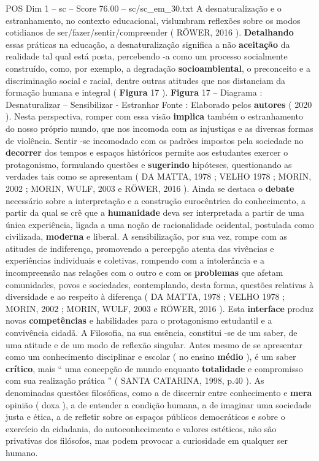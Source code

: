 \begin{textsample}{POS Dim 1 – sc – Score 76.00 – sc/sc\_em\_30.txt}
A desnaturalização e o estranhamento, no contexto educacional, vislumbram reflexões sobre os modos cotidianos de ser/fazer/sentir/compreender ( RÖWER, 2016 ). \textbf{Detalhando} essas práticas na educação, a desnaturalização significa a não \textbf{aceitação} da realidade tal qual está posta, percebendo -a como um processo socialmente construído, como, por exemplo, a degradação \textbf{socioambiental}, o preconceito e a discriminação social e racial, dentre outras atitudes que nos distanciam da formação humana e integral ( \textbf{Figura} 17 ). \textbf{Figura} 17 – Diagrama : Desnaturalizar – Sensibilizar - Estranhar Fonte : Elaborado pelos \textbf{autores} ( 2020 ).
Nesta perspectiva, romper com essa visão \textbf{implica} também o estranhamento do nosso próprio mundo, que nos incomoda com as injustiças e as diversas formas de violência.
Sentir -se incomodado com os padrões impostos pela sociedade no \textbf{decorrer} dos tempos e espaços históricos permite aos estudantes exercer o protagonismo, formulando questões e \textbf{sugerindo} hipóteses, questionando as verdades tais como se apresentam ( DA MATTA, 1978 ; VELHO 1978 ; MORIN, 2002 ; MORIN, WULF, 2003 e RÖWER, 2016 ).
Ainda se destaca o \textbf{debate} necessário sobre a interpretação e a construção eurocêntrica do conhecimento, a partir da qual se crê que a \textbf{humanidade} deva ser interpretada a partir de uma única experiência, ligada a uma noção de racionalidade ocidental, postulada como civilizada, \textbf{moderna} e liberal.
A sensibilização, por sua vez, rompe com as atitudes de indiferença, promovendo a percepção atenta das vivências e experiências individuais e coletivas, rompendo com a intolerância e a incompreensão nas relações com o outro e com os \textbf{problemas} que afetam comunidades, povos e sociedades, contemplando, desta forma, questões relativas à diversidade e ao respeito à diferença ( DA MATTA, 1978 ; VELHO 1978 ; MORIN, 2002 ; MORIN, WULF, 2003 e RÖWER, 2016 ).
Esta \textbf{interface} produz novas \textbf{competências} e habilidades para o protagonismo estudantil e a convivência cidadã.
A Filosofia, na sua essência, constitui -se de um saber, de uma atitude e de um modo de reflexão singular.
Antes mesmo de se apresentar como um conhecimento disciplinar e escolar ( no ensino \textbf{médio} ), é um saber \textbf{crítico}, mais “ uma concepção de mundo enquanto \textbf{totalidade} e compromisso com sua realização prática ” ( SANTA CATARINA, 1998, p.40 ).
As denominadas questões filosóficas, como a de discernir entre conhecimento e \textbf{mera} opinião ( doxa ), a de entender a condição humana, a de imaginar uma sociedade justa e ética, a de refletir sobre os espaços públicos democráticos e sobre o exercício da cidadania, do autoconhecimento e valores estéticos, não são privativas dos filósofos, mas podem provocar a curiosidade em qualquer ser humano.

\end{textsample}
